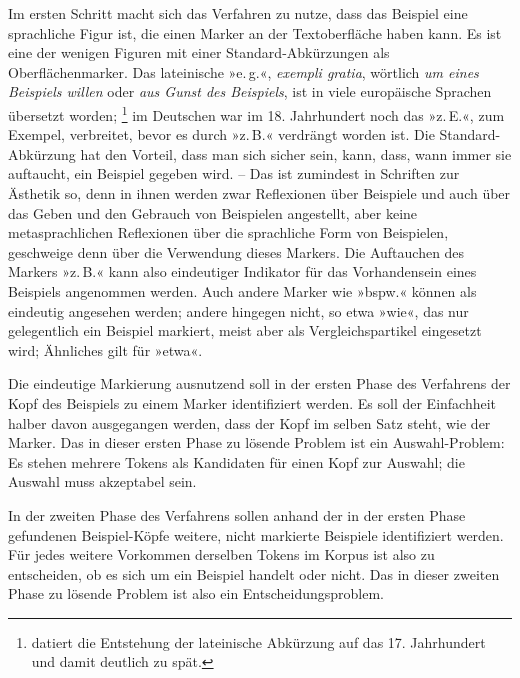 \documentclass{article}
\newcommand*{\latein}{\textit}%
\renewcommand*{\see}{\autocap{v}gl\adddot}%
\begin{document}
Im ersten Schritt macht sich das Verfahren zu nutze, dass das Beispiel
eine sprachliche Figur ist, die einen Marker an der Textoberfläche
haben kann. Es ist eine der wenigen Figuren mit einer
Standard-Abkürzungen als Oberflächenmarker. Das lateinische »e.\,g.«,
\latein{exempli gratia}, wörtlich \emph{um eines Beispiels willen}
oder \emph{aus Gunst des Beispiels}, ist in viele europäische Sprachen
übersetzt worden;%
\footnote{\Textcite[118]{Cappelli1990a} datiert die Entstehung der
  lateinische Abkürzung auf das 17. Jahrhundert und damit deutlich zu
  spät.} %
im Deutschen war im 18. Jahrhundert noch das »z.\,E.«, zum Exempel,
verbreitet, bevor es durch »z.\,B.« verdrängt worden ist.%
Die Standard-Abkürzung hat den Vorteil, dass man sich sicher sein,
kann, dass, wann immer sie auftaucht, ein Beispiel gegeben wird. --
Das ist zumindest in Schriften zur Ästhetik so, denn in ihnen werden
zwar Reflexionen über Beispiele und auch über das Geben und den
Gebrauch von Beispielen angestellt, aber keine metasprachlichen
Reflexionen über die sprachliche Form von Beispielen, geschweige denn
über die Verwendung dieses Markers. Die Auftauchen des Markers
»z.\,B.« kann also eindeutiger Indikator für das Vorhandensein eines
Beispiels angenommen werden. Auch andere Marker wie »bspw.« können als
eindeutig angesehen werden; andere hingegen nicht, so etwa »wie«, das
nur gelegentlich ein Beispiel markiert, meist aber als
Vergleichspartikel eingesetzt wird; Ähnliches gilt für »etwa«.

Die eindeutige Markierung ausnutzend soll in der ersten Phase des
Verfahrens der Kopf des Beispiels zu einem Marker identifiziert
werden. Es soll der Einfachheit halber davon ausgegangen werden, dass
der Kopf im selben Satz steht, wie der Marker. Das in dieser ersten
Phase zu lösende Problem ist ein Auswahl-Problem: Es stehen mehrere
Tokens als Kandidaten für einen Kopf zur Auswahl; die Auswahl muss
akzeptabel sein.

In der zweiten Phase des Verfahrens sollen anhand der in der ersten
Phase gefundenen Beispiel-Köpfe weitere, nicht markierte Beispiele
identifiziert werden. Für jedes weitere Vorkommen derselben Tokens im
Korpus ist also zu entscheiden, ob es sich um ein Beispiel handelt
oder nicht. Das in dieser zweiten Phase zu lösende Problem ist also
ein Entscheidungsproblem.
\end{document}
